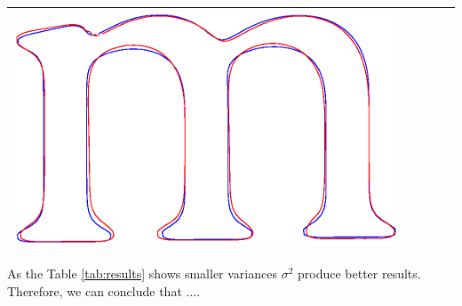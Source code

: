 \documentclass[12pt]{article}
\begin{document}
\begin{center}
\begin{table}[h]
\begin{tabular}{|c|c|c|c|c|}
\includegraphics[scale = 0.2]{images/f3var0_01} \\ \hline
\end{tabular}
\end{table}
\end{center}

As the Table \ref{tab:results} shows smaller variances $\sigma^2$ produce better results.
Therefore, we can conclude that ....
\end{document}

